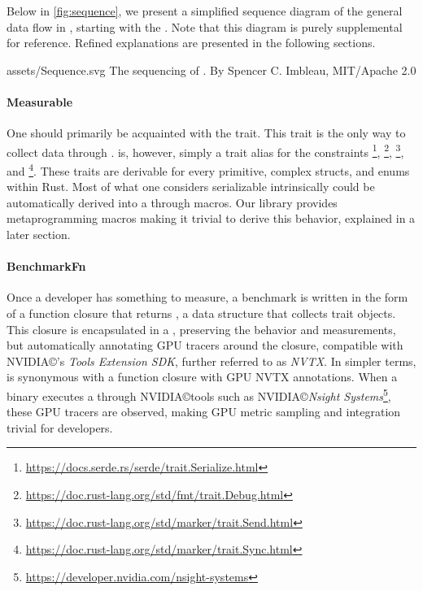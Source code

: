 Below in \cref{fig:sequence}, we present a simplified sequence diagram of the general data flow in \toollinkedname, starting with the . Note that this diagram is purely supplemental for reference. Refined explanations are presented in the following sections.

\widesvg
{assets/Sequence.svg}
{The sequencing of \toollinkedname.\label{fig:sequence}}
{By Spencer C. Imbleau, MIT/Apache 2.0}
\medskip

\paragraph{Measurable}
One should primarily be acquainted with the  trait. This trait is the only way to collect data through \toollinkedname.  is, however, simply a trait alias for the constraints \footnote{\href{https://docs.serde.rs/serde/trait.Serialize.html}{https://docs.serde.rs/serde/trait.Serialize.html}}, \footnote{\href{https://doc.rust-lang.org/std/fmt/trait.Debug.html}{https://doc.rust-lang.org/std/fmt/trait.Debug.html}}, \footnote{\href{https://doc.rust-lang.org/std/marker/trait.Send.html}{https://doc.rust-lang.org/std/marker/trait.Send.html}}, and \footnote{\href{https://doc.rust-lang.org/std/marker/trait.Sync.html}{https://doc.rust-lang.org/std/marker/trait.Sync.html}}. These traits are derivable for every primitive, complex structs, and enums within Rust. Most of what one considers serializable intrinsically could be automatically derived into a  through macros. Our library provides metaprogramming macros making it trivial to derive this behavior, explained in a later section.

\paragraph{BenchmarkFn}\label{sec:benchmarkfn}
Once a developer has something to measure, a benchmark is written in the form of a function closure that returns , a data structure that collects  trait objects. This closure is encapsulated in a , preserving the behavior and measurements, but automatically annotating GPU tracers around the closure, compatible with NVIDIA\copyright's \textit{Tools Extension SDK}, further referred to as \emph{NVTX}. In simpler terms,  is synonymous with a function closure with GPU NVTX annotations. When a binary executes a  through NVIDIA\copyright tools such as NVIDIA\copyright \textit{Nsight Systems}\footnote{\href{https://developer.nvidia.com/nsight-systems}{https://developer.nvidia.com/nsight-systems}}, these GPU tracers are observed, making GPU metric sampling and integration trivial for developers.

